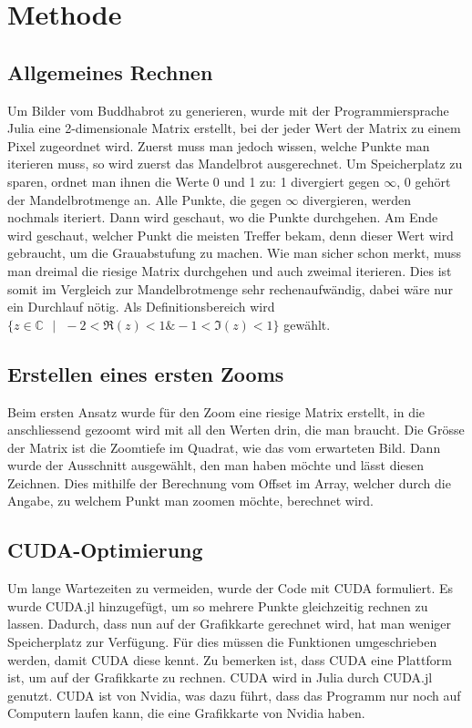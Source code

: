 \section{Methode}
\subsection{Allgemeines Rechnen}
Um Bilder vom Buddhabrot zu generieren, wurde mit der Programmiersprache Julia eine 2-dimensionale Matrix erstellt, bei der jeder Wert der Matrix zu einem Pixel zugeordnet wird. Zuerst muss man jedoch wissen, welche Punkte man iterieren muss, so wird zuerst das Mandelbrot ausgerechnet. Um Speicherplatz zu sparen, ordnet man ihnen die Werte 0 und 1 zu: 1 divergiert gegen $\infty$, 0 gehört der Mandelbrotmenge an. Alle Punkte, die gegen $\infty$ divergieren, werden nochmals iteriert. Dann wird geschaut, wo die Punkte durchgehen. Am Ende wird geschaut, welcher Punkt die meisten Treffer bekam, denn dieser Wert wird gebraucht, um die Grauabstufung zu machen. Wie man sicher schon merkt, muss man dreimal die riesige Matrix durchgehen und auch zweimal iterieren. Dies ist somit im Vergleich zur Mandelbrotmenge sehr rechenaufwändig, dabei wäre nur ein Durchlauf nötig. Als Definitionsbereich wird $\{z \in \mathbb{C}\text{ }|\text{ }-2 < \Re(z) < 1 \& -1 < \Im(z) < 1\}$ gewählt.
\subsection{Erstellen eines ersten Zooms}
Beim ersten Ansatz wurde für den Zoom eine riesige Matrix erstellt, in die anschliessend gezoomt wird mit all den Werten drin, die man braucht. Die Grösse der Matrix ist die Zoomtiefe im Quadrat, wie das vom erwarteten Bild. Dann wurde der Ausschnitt ausgewählt, den man haben möchte und lässt diesen Zeichnen. Dies mithilfe der Berechnung vom Offset im Array, welcher durch die Angabe, zu welchem Punkt man zoomen möchte, berechnet wird.
\subsection{CUDA-Optimierung}
Um lange Wartezeiten zu vermeiden, wurde der Code mit CUDA formuliert. Es wurde CUDA.jl hinzugefügt, um so mehrere Punkte gleichzeitig rechnen zu lassen. Dadurch, dass nun auf der Grafikkarte gerechnet wird, hat man weniger Speicherplatz zur Verfügung. Für dies müssen die Funktionen umgeschrieben werden, damit CUDA diese kennt. Zu bemerken ist, dass CUDA eine Plattform ist, um auf der Grafikkarte zu rechnen. CUDA wird in Julia durch CUDA.jl genutzt. CUDA ist von Nvidia, was dazu führt, dass das Programm nur noch auf Computern laufen kann, die eine Grafikkarte von Nvidia haben.
